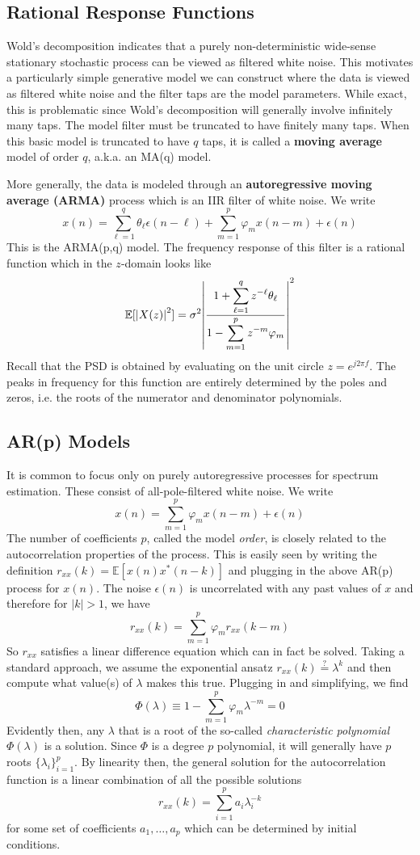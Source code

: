 \documentclass[twocolumn]{gwclass}
\begin{document}
\subsection{Rational Response Functions}
Wold's decomposition indicates that a purely non-deterministic wide-sense stationary stochastic process can be viewed as filtered white noise. This motivates a particularly simple generative model we can construct where the data is viewed as filtered white noise and the filter taps are the model parameters. While exact, this is problematic since Wold's decomposition will generally involve infinitely many taps. The model filter must be truncated to have finitely many taps. When this basic model is truncated to have $q$ taps, it is called a \textbf{moving average} model of order $q$, a.k.a. an MA(q) model.

More generally, the data is modeled through an \textbf{autoregressive moving average (ARMA)} process which is an IIR filter of white noise. We write
$$ x(n) = \sum_{\ell=1}^{q}\theta_\ell \epsilon(n-\ell)  + \sum_{m=1}^p\varphi_m x(n-m) + \epsilon(n)  $$
This is the ARMA(p,q) model. The frequency response of this filter is a rational function which in the $z$-domain looks like
$$ \mathbb{E}[\abs{X(z)}^2] = \sigma^2\abs{\frac{1 + \displaystyle\sum_{\ell=1}^q z^{-\ell}\theta_\ell}{1 - \displaystyle\sum_{m=1}^p z^{-m}\varphi_m}}^2 $$
Recall that the PSD is obtained by evaluating on the unit circle $z=e^{j2\pi f}$. The peaks in frequency for this function are entirely determined by the poles and zeros, i.e. the roots of the numerator and denominator polynomials. 
\subsection{AR(p) Models}
It is common to focus only on purely autoregressive processes for spectrum estimation. These consist of all-pole-filtered white noise. We write
$$ x(n) = \sum_{m=1}^p \varphi_m x(n-m) + \epsilon(n) $$
The number of coefficients $p$, called the model \emph{order}, is closely related to the autocorrelation properties of the process. This is easily seen by writing the definition $r_{xx}(k)=\mathbb{E}[x(n)x^*(n-k)]$ and plugging in the above AR(p) process for $x(n)$. The noise $\epsilon(n)$ is uncorrelated with any past values of $x$ and therefore for $|k|>1$, we have
$$ r_{xx}(k) = \sum_{m=1}^p\varphi_m r_{xx}(k-m)$$
So $r_{xx}$ satisfies a linear difference equation which can in  fact be solved. Taking a standard approach, we assume the exponential ansatz $r_{xx}(k) \stackrel{?}{=} \lambda^k$ and then compute what value(s) of $\lambda$ makes this true. Plugging in and simplifying, we find
$$ \Phi(\lambda) \equiv 1 -  \sum_{m=1}^p \varphi_m \lambda^{-m} = 0 $$
Evidently then, any $\lambda$ that is a root of the so-called \emph{characteristic polynomial} $\Phi(\lambda)$ is a solution. Since $\Phi$ is a degree $p$ polynomial, it will generally have $p$ roots $\{\lambda_i\}_{i=1}^p$. By linearity then, the general solution for the autocorrelation function is a linear combination of all the possible solutions
$$ r_{xx}(k) = \sum_{i=1}^p a_i \lambda_i^{-k} $$
for some set of coefficients $a_1,\dots,a_p$ which can be determined by initial conditions. 
\end{document}
